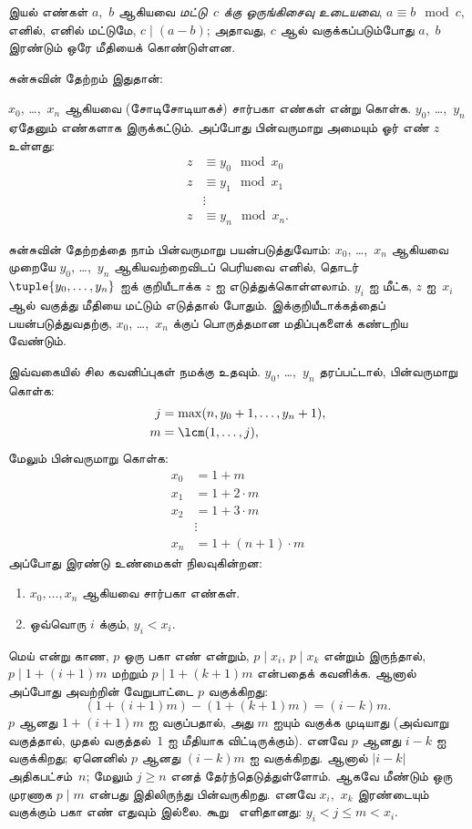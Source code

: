 \documentclass[../../../include/open-logic-section]{subfiles}
\begin{document}
\begin{defn}
இயல் எண்கள் $a$,~$b$ ஆகியவை \emph{மட்டு~$c$ க்கு ஒருங்கிசைவு உடையவை},
$a \equiv b \mod c$, எனில், எனில் மட்டுமே, $c \mid (a-b)$; அதாவது,
$c$ ஆல் வகுக்கப்படும்போது $a$,~$b$ இரண்டும் ஒரே மீதியைக் கொண்டுள்ளன.
\end{defn}

சுன்சுவின் தேற்றம் இதுதான்:
\begin{thm}
$x_0$, \dots,~$x_n$ ஆகியவை (சோடிசோடியாகச்) சார்பகா எண்கள் என்று கொள்க.
$y_0$, \dots,~$y_n$ ஏதேனும் எண்களாக இருக்கட்டும். அப்போது பின்வருமாறு
அமையும் ஓர் எண் $z$ உள்ளது:
\begin{align*}
z & \equiv y_0 \mod x_0 \\
z & \equiv y_1 \mod x_1 \\
& \vdots  \\
z & \equiv y_n \mod x_n.
\end{align*}
\end{thm}

சுன்சுவின் தேற்றத்தை நாம் பின்வருமாறு பயன்படுத்துவோம்: $x_0$,
\dots,~$x_n$ ஆகியவை முறையே $y_0$, \dots,~$y_n$ ஆகியவற்றைவிடப்
பெரியவை எனில், தொடர் $\tuple{y_0, \dots,y_n}$ ஐக் குறியீடாக்க $z$ ஐ
எடுத்துக்கொள்ளலாம். $y_i$ ஐ மீட்க, $z$ ஐ~$x_i$ ஆல் வகுத்து மீதியை
மட்டும் எடுத்தால் போதும். இக்குறியீடாக்கத்தைப் பயன்படுத்துவதற்கு,
$x_0$, \dots,~$x_n$ க்குப் பொருத்தமான மதிப்புகளைக் கண்டறிய வேண்டும்.

இவ்வகையில் சில கவனிப்புகள் நமக்கு உதவும். $y_0$, \dots,~$y_n$
தரப்பட்டால், பின்வருமாறு கொள்க:
\begin{align*}
j &= \max(n, y_0 + 1, \dots, y_n + 1), \\
m &= \lcm(1,\dots,j),
\end{align*}
மேலும் பின்வருமாறு கொள்க:
\begin{align*}
x_0 & = 1 + m \\
x_1 & = 1 + 2 \cdot m \\
x_2 & = 1 + 3 \cdot m \\
& \vdots  \\
x_n & = 1 + (n+1) \cdot m
\end{align*}
அப்போது இரண்டு உண்மைகள் நிலவுகின்றன:
\begin{enumerate}
\item{} $x_0,\dots,x_n$ ஆகியவை சார்பகா எண்கள்.
\item{} ஒவ்வொரு $i$ க்கும், $y_i < x_i$.
\end{enumerate}
 மெய் என்று காண, $p$ ஒரு பகா எண் என்றும்,
$p \mid x_i$, $p \mid x_k$ என்றும் இருந்தால், $p \mid 1 + (i+1) m$
மற்றும் $p \mid 1 + (k+1) m$ என்பதைக் கவனிக்க. ஆனால் அப்போது அவற்றின்
வேறுபாட்டை $p$ வகுக்கிறது:
\[
(1 + (i+1)m) - (1+ (k+1)m) = (i-k) m.
\]
$p$ ஆனது $1 + (i+1)m$ ஐ வகுப்பதால், அது $m$ ஐயும் வகுக்க முடியாது
(அவ்வாறு வகுத்தால், முதல் வகுத்தல்~$1$ ஐ மீதியாக விட்டிருக்கும்). எனவே
$p$ ஆனது $i-k$ ஐ வகுக்கிறது; ஏனெனில் $p$ ஆனது $(i-k)m$ ஐ வகுக்கிறது. ஆனால்
$\left|i-k\right|$ அதிகபட்சம்~$n$; மேலும் $j \geq n$ எனத்
தேர்ந்தெடுத்துள்ளோம். ஆகவே மீண்டும் ஒரு முரணாக $p \mid m$ என்பது இதிலிருந்து
பின்வருகிறது. எனவே $x_i$,~$x_k$ இரண்டையும் வகுக்கும் பகா எண் எதுவும்
இல்லை. கூறு~ எளிதானது: $y_i < j \leq m < x_i$.
\end{document}
